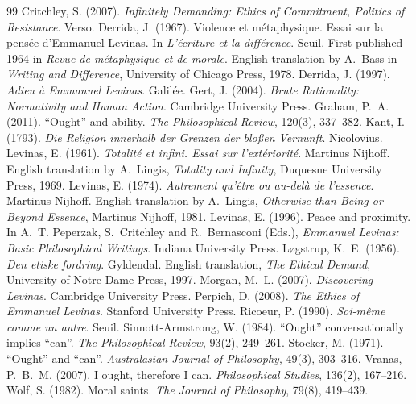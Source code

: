 \documentclass{situationist-preprint}
\begin{document}
\begin{thebibliography}{99}\small
{} Critchley, S. (2007). \emph{Infinitely Demanding: Ethics of Commitment, Politics of Resistance}. Verso.
 Derrida, J. (1967). Violence et métaphysique. Essai sur la pensée d'Emmanuel Levinas. In \emph{L'écriture et la différence}. Seuil. First published 1964 in \emph{Revue de métaphysique et de morale}. English translation by A.~Bass in \emph{Writing and Difference}, University of Chicago Press, 1978.
 Derrida, J. (1997). \emph{Adieu à Emmanuel Levinas}. Galilée.
 Gert, J. (2004). \emph{Brute Rationality: Normativity and Human Action}. Cambridge University Press.
 Graham, P.~A. (2011). \enquote{Ought} and ability. \emph{The Philosophical Review}, 120(3), 337--382.
 Kant, I. (1793). \emph{Die Religion innerhalb der Grenzen der bloßen Vernunft}. Nicolovius.
 Levinas, E. (1961). \emph{Totalité et infini. Essai sur l'extériorité}. Martinus Nijhoff. English translation by A.~Lingis, \emph{Totality and Infinity}, Duquesne University Press, 1969.
 Levinas, E. (1974). \emph{Autrement qu'être ou au-delà de l'essence}. Martinus Nijhoff. English translation by A.~Lingis, \emph{Otherwise than Being or Beyond Essence}, Martinus Nijhoff, 1981.
 Levinas, E. (1996). Peace and proximity. In A.~T. Peperzak, S.~Critchley and R.~Bernasconi (Eds.), \emph{Emmanuel Levinas: Basic Philosophical Writings}. Indiana University Press.
 Løgstrup, K.~E. (1956). \emph{Den etiske fordring}. Gyldendal. English translation, \emph{The Ethical Demand}, University of Notre Dame Press, 1997.
 Morgan, M.~L. (2007). \emph{Discovering Levinas}. Cambridge University Press.
 Perpich, D. (2008). \emph{The Ethics of Emmanuel Levinas}. Stanford University Press.
 Ricoeur, P. (1990). \emph{Soi-même comme un autre}. Seuil.
 Sinnott-Armstrong, W. (1984). \enquote{Ought} conversationally implies \enquote{can}. \emph{The Philosophical Review}, 93(2), 249--261.
 Stocker, M. (1971). \enquote{Ought} and \enquote{can}. \emph{Australasian Journal of Philosophy}, 49(3), 303--316.
 Vranas, P.~B.~M. (2007). I ought, therefore I can. \emph{Philosophical Studies}, 136(2), 167--216.
 Wolf, S. (1982). Moral saints. \emph{The Journal of Philosophy}, 79(8), 419--439.
\end{thebibliography}
\end{document}
